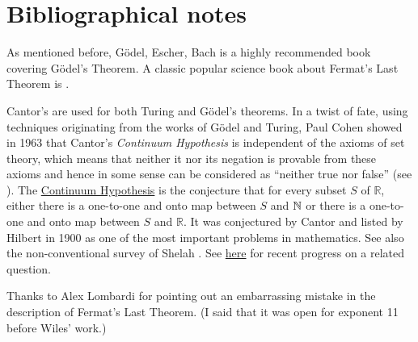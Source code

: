 \section{Bibliographical notes}\label{Bibliographical-notes}

As mentioned before, Gödel, Escher, Bach \cite{hofstadter1999} is a
highly recommended book covering Gödel's Theorem. A classic popular
science book about Fermat's Last Theorem is \cite{singh1997fermat}.

Cantor's are used for both Turing and Gödel's theorems. In a twist of
fate, using techniques originating from the works of Gödel and Turing,
Paul Cohen showed in 1963 that Cantor's \emph{Continuum Hypothesis} is
independent of the axioms of set theory, which means that neither it nor
its negation is provable from these axioms and hence in some sense can
be considered as ``neither true nor false'' (see \cite{cohen2008set}).
The \href{https://goo.gl/9ieBVq}{Continuum Hypothesis} is the conjecture
that for every subset \(S\) of \(\mathbb{R}\), either there is a
one-to-one and onto map between \(S\) and \({\mathbb{N}}\) or there is a
one-to-one and onto map between \(S\) and \(\mathbb{R}\). It was
conjectured by Cantor and listed by Hilbert in 1900 as one of the most
important problems in mathematics. See also the non-conventional survey
of Shelah \cite{shelah2003logical}. See
\href{https://gowers.wordpress.com/2017/09/19/two-infinities-that-are-surprisingly-equal/}{here}
for recent progress on a related question.

Thanks to Alex Lombardi for pointing out an embarrassing mistake in the
description of Fermat's Last Theorem. (I said that it was open for
exponent 11 before Wiles' work.)

